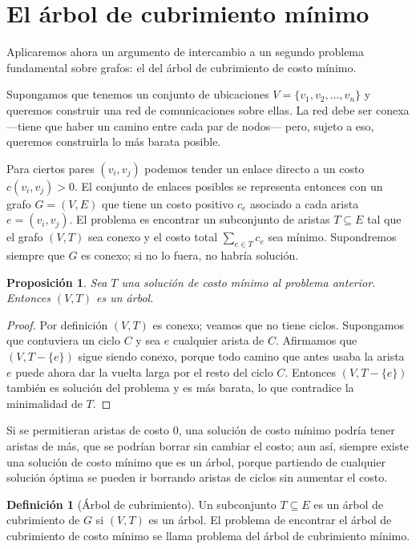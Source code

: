 \documentclass[12pt, spanish, oneside, openany]{book}
\theoremstyle{uprightplain}
\newtheorem{proposicion}[teorema]{Proposición}
\theoremstyle{definition}
\newtheorem{definicion}[teorema]{Definición}
\theoremstyle{remark}
\theoremstyle{definition}
\begin{document}
\section{El árbol de cubrimiento mínimo}
\label{sec:mst}

Aplicaremos ahora un argumento de intercambio a un segundo problema fundamental sobre grafos: el del árbol de cubrimiento de costo mínimo.

Supongamos que tenemos un conjunto de ubicaciones $V=\{v_1,v_2,\dots,v_n\}$ y queremos construir una red de comunicaciones sobre ellas. La red debe ser conexa ---tiene que haber un camino entre cada par de nodos--- pero, sujeto a eso, queremos construirla lo más barata posible.

Para ciertos pares $(v_i,v_j)$ podemos tender un enlace directo a un costo $c(v_i,v_j)>0$. El conjunto de enlaces posibles se representa entonces con un grafo $G=(V,E)$ que tiene un costo positivo $c_e$ asociado a cada arista $e=(v_i,v_j)$. El problema es encontrar un subconjunto de aristas $T \subseteq E$ tal que el grafo $(V,T)$ sea conexo y el costo total $\sum_{e \in T} c_e$ sea mínimo. Supondremos siempre que $G$ es conexo; si no lo fuera, no habría solución.

\begin{proposicion}
\label{prop:mst-es-arbol}
Sea $T$ una solución de costo mínimo al problema anterior. Entonces $(V,T)$ es un árbol.
\end{proposicion}
\begin{proof}
Por definición $(V,T)$ es conexo; veamos que no tiene ciclos. Supongamos que contuviera un ciclo $C$ y sea $e$ cualquier arista de $C$. Afirmamos que $(V,T-\{e\})$ sigue siendo conexo, porque todo camino que antes usaba la arista $e$ puede ahora dar la vuelta larga por el resto del ciclo $C$. Entonces $(V,T-\{e\})$ también es solución del problema y es más barata, lo que contradice la minimalidad de $T$.
\end{proof}

Si se permitieran aristas de costo $0$, una solución de costo mínimo podría tener aristas de más, que se podrían borrar sin cambiar el costo; aun así, siempre existe una solución de costo mínimo que es un árbol, porque partiendo de cualquier solución óptima se pueden ir borrando aristas de ciclos sin aumentar el costo.

\begin{definicion}[Árbol de cubrimiento]
\label{def:arbol-generador}
Un subconjunto $T \subseteq E$ es un árbol de cubrimiento de $G$ si $(V,T)$ es un árbol. El problema de encontrar el árbol de cubrimiento de costo mínimo se llama problema del árbol de cubrimiento mínimo.
\end{definicion}
\end{document}

